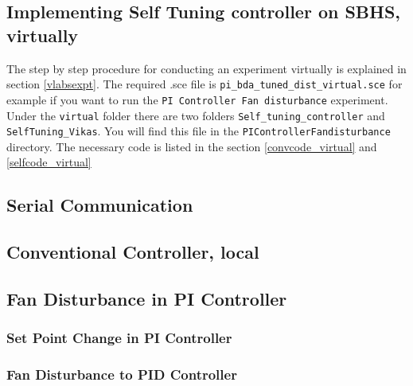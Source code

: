 \subsection{Implementing Self Tuning controller on SBHS, virtually}
The step by step procedure for conducting an experiment virtually is explained in section \ref{vlabsexpt}. The required .sce file is {\tt pi\_bda\_tuned\_dist\_virtual.sce} for example if you want to run the {\tt PI Controller Fan disturbance} experiment.  Under the {\tt virtual} folder there are two folders {\tt Self\_tuning\_controller} and {\tt SelfTuning\_Vikas}. You will find this file in the {\tt PIControllerFandisturbance} directory. The necessary code is listed in the section \ref{convcode_virtual} and \ref{selfcode_virtual}


\subsection{Serial Communication}
\begin{code}

\end{code}


\subsection{Conventional Controller, local}\label{convcode_local}
\subsection{Fan Disturbance in PI Controller}
\begin{code}

\end{code}


\subsubsection{Set Point Change in PI Controller}
\begin{code}

\end{code}



\subsubsection{Fan Disturbance to PID Controller}
\begin{code}

\end{code}


